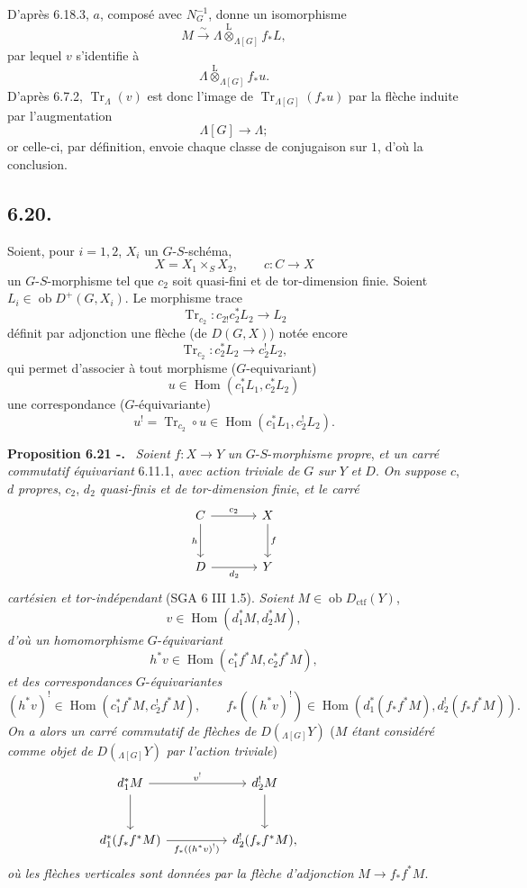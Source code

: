 \documentclass[11pt]{article}
\newenvironment{statement}[1]{\par\medskip\noindent\textbf{#1.}\ }{\par\medskip}
\DeclareMathOperator{\Hom}{Hom}
\providecommand{\Tr}{\operatorname{Tr}}
\providecommand{\Tr}{\operatorname{Tr}}
\providecommand{\lten}{\overset{\mathrm L}{\otimes}}
\providecommand{\Ob}{\operatorname{ob}}
\providecommand{\Tr}{\operatorname{Tr}}
\providecommand{\Hom}{\operatorname{Hom}}
\providecommand{\lten}{\overset{\mathrm L}{\otimes}}
\providecommand{\lten}{\overset{\mathrm L}{\otimes}}
\providecommand{\Ob}{\operatorname{ob}}
\providecommand{\Tr}{\operatorname{Tr}}
\providecommand{\lten}{\overset{\mathrm L}{\otimes}}
\providecommand{\lten}{\overset{\mathrm L}{\otimes}}
\providecommand{\Ob}{\operatorname{Ob}}
\providecommand{\lten}{\overset{\mathrm L}{\otimes}}
\providecommand{\Hom}{\operatorname{Hom}}
\providecommand{\Tr}{\operatorname{Tr}}
\providecommand{\Ob}{\operatorname{ob}}
\providecommand{\Ob}{\operatorname{Ob}}
\providecommand{\lten}{\overset{\mathrm L}{\otimes}}
\begin{document}
D'après 6.18.3, $a$,
composé avec $N_G^{-1}$, donne un isomorphisme
\[
M\xrightarrow{\sim}\Lambda\lten_{\Lambda[G]}f_*L,
\]
par lequel $v$ s'identifie à
\[
\Lambda\lten_{\Lambda[G]}f_*u.
\]
D'après 6.7.2, $\Tr_{\Lambda}(v)$ est donc l'image de $\Tr_{\Lambda[G]}(f_*u)$ par la flèche induite par l'augmentation
\[
\Lambda[G]\longrightarrow \Lambda;
\]
or celle-ci, par définition, envoie chaque classe de conjugaison sur $1$, d'où la conclusion.

\subsection*{6.20.}
Soient, pour $i=1,2$, $X_i$ un $G$-$S$-schéma,
\[
X=X_1\times_SX_2,\qquad c:C\to X
\]
un $G$-$S$-morphisme tel que $c_2$ soit quasi-fini et de tor-dimension finie. Soient $L_i\in\Ob D^+(G,X_i)$. Le morphisme trace
\[
\Tr_{c_2}:c_{2!}c_2^*L_2\longrightarrow L_2
\]
définit par adjonction une flèche (de $D(G,X)$) notée encore
\begin{equation}
\Tr_{c_2}:c_2^*L_2\longrightarrow c_2^!L_2,
\tag{6.20.1}
\end{equation}
qui permet d'associer à tout morphisme ($G$-equivariant)
\[
u\in\Hom(c_1^*L_1,c_2^*L_2)
\]
une correspondance ($G$-équivariante)
\begin{equation}
u^! = \Tr_{c_2}\circ u\in\Hom(c_1^*L_1,c_2^!L_2).
\tag{6.20.2}
\end{equation}

\begin{statement}{Proposition 6.21 -}
\emph{Soient} $f:X\to Y$ \emph{un} $G$-$S$-\emph{morphisme propre}, \emph{et un carré commutatif équivariant} 6.11.1, \emph{avec action triviale de} $G$ \emph{sur} $Y$ \emph{et} $D$. \emph{On suppose} $c$, $d$ \emph{propres}, $c_2$, $d_2$ \emph{quasi-finis et de tor-dimension finie}, \emph{et le carré}
\[
\begin{tikzcd}[column sep=large,row sep=large]
C \arrow[r,"c_2"] \arrow[d,"h"'] & X \arrow[d,"f"]\\
D \arrow[r,"d_2"'] & Y
\end{tikzcd}
\]
\emph{cartésien et tor-indépendant} (SGA 6 III 1.5). \emph{Soient} $M\in\Ob D_{\mathrm{ctf}}(Y)$,
\[
v\in\Hom(d_1^*M,d_2^*M),
\]
\emph{d'où un homomorphisme} $G$-\emph{équivariant}
\[
h^*v\in\Hom(c_1^*f^*M,c_2^*f^*M),
\]
\emph{et des correspondances} $G$-\emph{équivariantes}
\[
(h^*v)^!\in\Hom(c_1^*f^*M,c_2^!f^*M),
\qquad
f_*((h^*v)^!)\in\Hom(d_1^*(f_*f^*M),d_2^!(f_*f^*M)).
\]
\emph{On a alors un carré commutatif de flèches de} $D({}_{\Lambda[G]}Y)$ ($M$ \emph{étant considéré comme objet de} $D({}_{\Lambda[G]}Y)$ \emph{par l'action triviale})
\[
\begin{tikzcd}[column sep=huge,row sep=large]
d_1^*M \arrow[r,"v^!"] \arrow[d] & d_2^!M \arrow[d] & {}\\
d_1^*(f_*f^*M) \arrow[r,"f_*((h^*v)^!)"'] & d_2^!(f_*f^*M),
\end{tikzcd}
\]
\emph{où les
flèches verticales sont données par la flèche d'adjonction} $M\to f_*f^*M$.
\end{statement}
\end{document}
